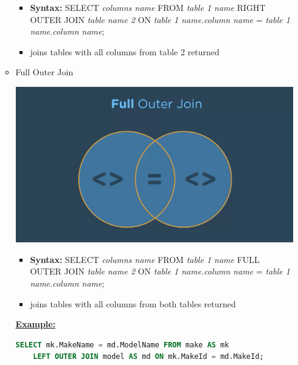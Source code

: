 \documentclass[12pt]{article}
\begin{document}
\begin{itemize}
\begin{itemize}
        \begin{itemize}
            \item \textbf{Syntax:} SELECT \textit{columns name} FROM \textit{table 1 name}
            RIGHT OUTER JOIN \textit{table name 2} ON \textit{table 1 name}.\textit{column name} = \textit{table 1 name}.\textit{column name};
            \item joins tables with all columns from table 2 returned
        \end{itemize}

        \item Full Outer Join
        \begin{center}
        \includegraphics[width=0.6\linewidth]{images/part_4_notes_7.png}
        \end{center}

        \begin{itemize}
            \item \textbf{Syntax:} SELECT \textit{columns name} FROM \textit{table 1 name}
            FULL OUTER JOIN \textit{table name 2} ON \textit{table 1 name}.\textit{column name} = \textit{table 1 name}.\textit{column name};
            \item joins tables with all columns from both tables returned
        \end{itemize}

        \bigskip

        \underline{\textbf{Example:}}

        \bigskip

    \begin{lstlisting}[language=SQL]
    SELECT mk.MakeName = md.ModelName FROM make AS mk
    LEFT OUTER JOIN model AS md ON mk.MakeId = md.MakeId;
    \end{lstlisting}

        \bigskip


\end{itemize}
\end{itemize}
\end{document}
